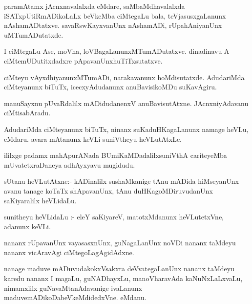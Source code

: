 \documentclass{article}
\begin{document}
\begin{mn}
paramAtamx jAcnxnavalalxda eMdare, saMbaMdhavalalxda iSATxpUtiRmADikoLaLx beVkeMba ciMtegaLu bala, 
teVjasusxgaLanunx nAshamADtatxve. savaRswKayxvanUnx nAshamADi, rUpahAniyanUnx uMTumADutatxde. 
\end{mn}

\begin{mn}
I ciMtegaLu Ase, moVha, loVBagaLanunxMTumADutatxve. dinadinavu A ciMtemUDutitxdadxre 
pApavanUnxhuTiTxsutatxve.
\end{mn}

\begin{mn}
ciMteyu vAyxdhiyanunxMTumADi, narakavanunx hoMdisutatxde. AdudariMda ciMteyanunx 
biTuTx, icecxyAdudanunx anuBavisikoMDu suKavAgiru.
\end{mn}

\begin{mn}
manuSayxnu  pUvaRdalilx mADidudanenxV anuBavisutAtxne. JAcnxniyAdavanu ciMtisabAradu. 
\end{mn}

\begin{mn}
AdudariMda ciMteyanunx biTuTx, ninanx suKaduHKagaLanunx namage heVLu, eMdaru. 
avara mAtanunx keVLi suniVtheyu heVLutAtxLe.
\end{mn}

\begin{mn}
ililxge padamx mahApurANada BUmiKaMDadalilxsuniVthA cariteyeMba mUvatetxraDaneya adhAyxyavu mugidudu.
\end{mn}




\begin{mn}
sUtanu heVLutAtxne:- kADinalilx sushaMkanige tAnu mADida hiMseyanUnx avanu tanage 
koTaTx shApavanUnx, tAnu duHKagoMDiruvudanUnx saKiyaralilx heVLidaLu. 
\end{mn}

\begin{mn}
sunitheyu heVLidaLu :- eleY saKiyareV, matotxMdanunx heVLutetxVne, adanunx keVLi.
\end{mn}

\begin{mn}
nananx rUpavanUnx  vayasasxnUnx, guNagaLanUnx noVDi nananx taMdeyu nananx 
vicAravAgi ciMtegoLagAgidAdxne.
\end{mn}

\begin{mn}
nanage  maduve mADuvudakokxVsakxra  deVvategaLanUnx nananx taMdeyu karedu nananx 
I magaLu, guNADhayxLu, manoVharavAda kaNuNxLaLxvaLu, nimamxlilx guNavaMtanAdavanige 
ivaLanunx maduvemADikoDabeVkeMdidedxVne.  eMdanu.
\end{mn}
\end{document}
